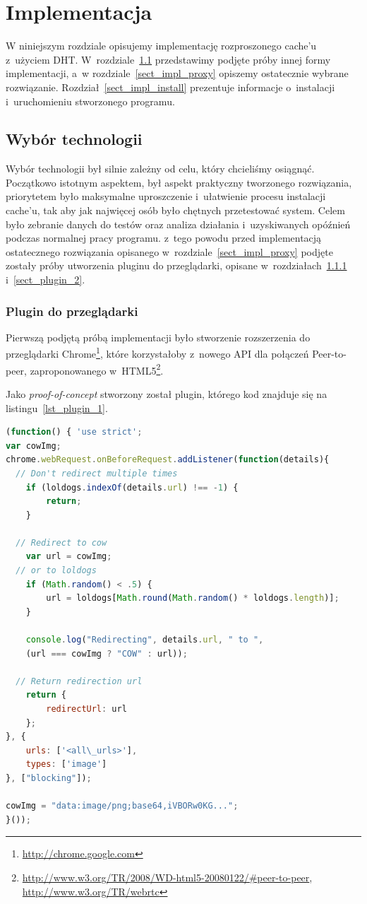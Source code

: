 \documentclass[a4paper,11pt]{scrartcl}
\newcommand{\s}{ }
\newcommand{\keszu}{cache'u}
\begin{document}
\section{Implementacja}
W niniejszym rozdziale opisujemy implementację rozproszonego \keszu\s z~użyciem DHT. W~rozdziale~\ref{sect_impl_technology}
przedstawimy podjęte próby innej formy implementacji, a~w rozdziale~\ref{sect_impl_proxy} opiszemy ostatecznie wybrane rozwiązanie.
Rozdział~\ref{sect_impl_install} prezentuje informacje o~instalacji i~uruchomieniu stworzonego programu.

\subsection{Wybór technologii}
\label{sect_impl_technology}
Wybór technologii był silnie zależny od celu, który chcieliśmy osiągnąć. Początkowo istotnym aspektem, był aspekt praktyczny tworzonego rozwiązania, priorytetem było maksymalne uproszczenie i~ułatwienie procesu instalacji \keszu, tak aby jak najwięcej osób było chętnych przetestować system. Celem było zebranie danych do testów oraz analiza działania i~uzyskiwanych opóźnień podczas normalnej pracy programu. z~tego powodu przed implementacją ostatecznego rozwiązania opisanego w~rozdziale~\ref{sect_impl_proxy} podjęte zostały próby utworzenia pluginu do przeglądarki, opisane w~rozdziałach~\ref{sect_plugin_1} i~\ref{sect_plugin_2}.

\subsubsection{Plugin do przeglądarki}
\label{sect_plugin_1}
Pierwszą podjętą próbą implementacji było stworzenie rozszerzenia do przeglądarki Chrome\footnote{\url{http://chrome.google.com}}, które korzystałoby z~nowego API dla połączeń Peer-to-peer, zaproponowanego w~HTML5\footnote{\url{http://www.w3.org/TR/2008/WD-html5-20080122/#peer-to-peer}, \url{http://www.w3.org/TR/webrtc}}.

Jako \textit{proof-of-concept} stworzony został plugin, którego kod znajduje się na listingu~\ref{lst_plugin_1}.

\begin{lstlisting}[language={JavaScript}, label={lst_plugin_1}, 
  caption={Kod rozszerzenia dla przeglądarki Chrome, realizujący \textit{proof-of-concept}.}]
(function() { 'use strict';
var cowImg;
chrome.webRequest.onBeforeRequest.addListener(function(details){
  // Don't redirect multiple times
	if (loldogs.indexOf(details.url) !== -1) {
		return;
	}
	
  // Redirect to cow
	var url = cowImg;
  // or to loldogs
	if (Math.random() < .5) {
		url = loldogs[Math.round(Math.random() * loldogs.length)];
	}
	
	console.log("Redirecting", details.url, " to ", 
    (url === cowImg ? "COW" : url));
    
  // Return redirection url
	return {
		redirectUrl: url
	};
}, {
	urls: ['<all\_urls>'],
	types: ['image']
}, ["blocking"]);

cowImg = "data:image/png;base64,iVBORw0KG...";
}());
\end{lstlisting}
\end{document}
